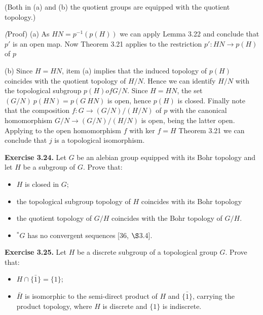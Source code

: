 \documentclass[12pt]{article}
\begin{document}
    (Both in (a) and (b) the quotient groups are equipped with the quotient topology.)


    \emph(Proof) (a) As $HN = p^{-1}(p(H))$ we can apply Lemma 3.22 and conclude that $p'$ is an open map. Now Theorem
    3.21 applies to the restriction $p' : HN \to p(H)$ of $p$


    (b) Since $H = HN$, item (a) implies that the induced topology of $p(H)$ coincides with the quotient topology
    of $H/N$. Hence we can identify $H/N$ with the topological subgroup $p(H) of G/N$. Since $H = HN$, the set
    $(G/N) \ p(HN) = p(G \ HN)$ is open, hence $p(H)$ is closed. Finally note that the composition $f : G \to (G/N)/(H/N)$
    of $p$ with the canonical homomorphism $G/N \to (G/N)/(H/N)$ is open, being the latter open.
    Applying to the open homomorphism $f$ with ker $f = H$ Theorem 3.21 we can conclude that $j$ is a topological
    isomorphism.
    

\textbf{Exercise 3.24.} Let $G$ be an alebian group equipped with its Bohr topology and let $H$ be a subgroup of $G$. Prove
that:


    \begin{itemize}

        \item $H$ is closed in $G$;
       
        \item the topological subgroup topology of $H$ coincides with its Bohr topology

        \item the quotient topology of $G/H$ coincides with the Bohr topology of $G/H$.
       
        \item $^* G$ has no convergent sequences [36, $\S$3.4].
    
    \end{itemize}


\textbf{Exercise 3.25.} Let $H$ be a discrete subgroup of a topological group $G$. Prove that:


    \begin{itemize}

        \item $H \cap \bar{\{1\}} = \{1\}$;
    
        \item $\bar{H}$ is isomorphic to the semi-direct product of $H$ and $\bar{\{1\}}$, carrying the product topology, where $H$ is discrete
        and $\{1\}$ is indiscrete.
    
    \end{itemize}
\end{document}
